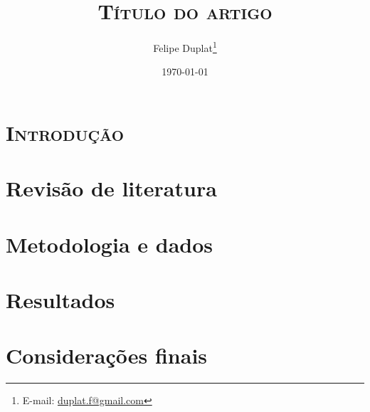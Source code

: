 \documentclass[a4paper, 11pt]{article}
\title{\textsc{Título do artigo}}
\author[$\Psi$]{Felipe Duplat\thanks{E-mail: \href{mailto:duplat.f@gmail.com}{duplat.f@gmail.com}}}
\affil[$\Psi$]{\footnotesize Universidade Federal do Paraná, Brasil}
\date{\today}
\begin{document}
\maketitle


\begin{abstract}
	\lipsum[1]
\end{abstract}


\vspace{0.5cm}



\begin{multicols}{2}

\section{\textsc{Introdução}}

\lipsum[1-5]



\section{Revisão de literatura}

\lipsum[1-7]



\section{Metodologia e dados}

\lipsum[1-4]



\section{Resultados}

\lipsum[1-5]



\section{Considerações finais}

\lipsum[1-6]



\printbibliography[title={Referências}]

\end{multicols}
\end{document}

